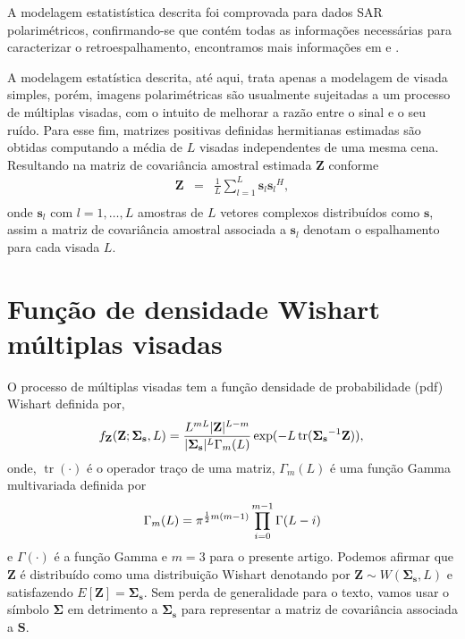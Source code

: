 \documentclass[conference]{IEEEtran}
\DeclareMathOperator{\traco}{tr}
\begin{document}
A modelagem estatistística descrita foi comprovada para dados SAR polarimétricos, confirmando-se que contém todas as informações necessárias para caracterizar o retroespalhamento, encontramos mais informações em \cite{sarabendi} e \cite{mfp}.
 
A modelagem estatística descrita, até aqui, trata apenas a modelagem de visada simples, porém, imagens polarimétricas são usualmente sujeitadas a um processo de múltiplas visadas, com o intuito de melhorar a razão entre o sinal e o seu ruído. Para esse fim, matrizes positivas definidas hermitianas estimadas são obtidas computando a média de $L$ visadas independentes de uma mesma cena. Resultando na matriz de covariância amostral estimada {\bf Z} conforme \cite{good, ade}
\begin{equation}\label{eq_04}
\begin{array}{ccc}
    \mathbf{Z}&=&\frac{1}{L}\displaystyle{\sum_{l=1}^{L} {\mathbf{s}_l}{\mathbf{s}_l}^H}, \\
\end{array}
\end{equation}
onde $\mathbf{s}_l$ com $l = 1, \dots, L$ amostras de $\mathit{L}$ vetores complexos distribuídos como $\mathbf{s}$, assim a matriz de covariância amostral associada a $\mathbf{s}_l$ denotam o espalhamento para cada visada $L$.

\section{Função de densidade Wishart múltiplas visadas}\label{sec_03}
O processo de múltiplas visadas tem a função densidade de probabilidade (pdf) Wishart  definida por,
\begin{equation}\label{eq_05}
    f_{\mathbf{Z}}(\mathbf{Z};\mathbf{\Sigma_{s}},L)=\frac{L^{mL}|\mathbf{Z}|^{L-m}}{|\mathbf{\Sigma_{s}}|^{L}\Gamma_m(L)} \exp(-L\traco(\mathbf{\Sigma_{s}}^{-1}\mathbf{Z})), \\
\end{equation} 
onde, $\traco(\cdot)$ é o operador traço de uma matriz, $\Gamma_m(L)$ é uma função Gamma multivariada definida por
\begin{equation*}
	\Gamma_m(L)=\pi^{\frac{1}{2}m(m-1)} \prod_{i=0}^{m-1}\Gamma(L-i) \\
\end{equation*}
e $\Gamma(\cdot)$ é a função Gamma e $m=3$ para o presente artigo. Podemos afirmar que $\mathbf{Z}$ é distribuído como uma distribuição Wishart denotando por $\mathbf{Z}\sim W(\mathbf{\Sigma_{s}}, L)$ e satisfazendo $E[\mathbf{Z}]=\mathbf{\Sigma_{s}}$. Sem perda de generalidade para o texto, vamos usar o símbolo $\mathbf{\Sigma}$ em detrimento a $\mathbf{\Sigma_{s}}$ para representar a matriz de covariância associada a $\mathbf{S}$.
\end{document}

